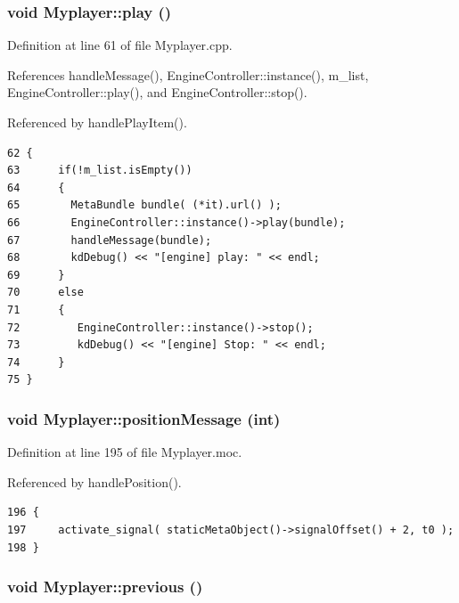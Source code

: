 \subsubsection{\setlength{\rightskip}{0pt plus 5cm}void Myplayer::play ()\hspace{0.3cm}{\tt  [slot]}}\label{classMyplayer_Myplayeri0}




Definition at line 61 of file Myplayer.cpp.

References handle\-Message(), Engine\-Controller::instance(), m\_\-list, Engine\-Controller::play(), and Engine\-Controller::stop().

Referenced by handle\-Play\-Item().



\footnotesize\begin{verbatim}62 {          
63      if(!m_list.isEmpty())
64      {
65        MetaBundle bundle( (*it).url() );        
66        EngineController::instance()->play(bundle); 
67        handleMessage(bundle);
68        kdDebug() << "[engine] play: " << endl;            
69      }
70      else
71      {
72         EngineController::instance()->stop();
73         kdDebug() << "[engine] Stop: " << endl;            
74      }
75 }
\end{verbatim}\normalsize 
{}
\subsubsection{\setlength{\rightskip}{0pt plus 5cm}void Myplayer::position\-Message (int)\hspace{0.3cm}{\tt  [signal]}}\label{classMyplayer_Myplayerl2}




Definition at line 195 of file Myplayer.moc.

Referenced by handle\-Position().



\footnotesize\begin{verbatim}196 {
197     activate_signal( staticMetaObject()->signalOffset() + 2, t0 );
198 }
\end{verbatim}\normalsize 
{}
\subsubsection{\setlength{\rightskip}{0pt plus 5cm}void Myplayer::previous ()\hspace{0.3cm}{\tt  [slot]}}\label{classMyplayer_Myplayeri5}




